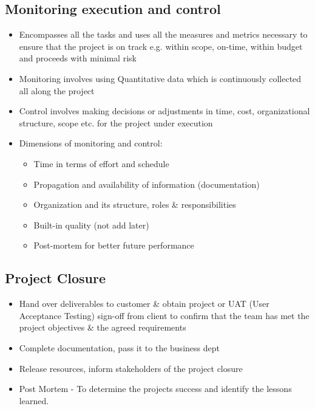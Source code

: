 \documentclass{article}
\begin{document}
\subsection{Monitoring execution and control}
\begin{itemize}
    \item Encompasses all the tasks and uses all the measures and metrics necessary to ensure that the project is on track e.g. within scope, on-time, within budget and proceeds with minimal risk
    
    \item Monitoring involves using Quantitative data which is continuously collected all along the project
    
    \item Control involves making decisions or adjustments in time, cost, organizational structure, scope etc. for the project under execution
    
    \item Dimensions of monitoring and control:
    \begin{itemize}
        \item Time in terms of effort and schedule
        
        \item Propagation and availability of information (documentation)
        
        \item Organization and its structure, roles \& responsibilities
        
        \item Built-in quality (not add later)
        
        \item Post-mortem for better future performance
    \end{itemize}
\end{itemize}

\subsection{Project Closure}
\begin{itemize}
    \item Hand over deliverables to customer \& obtain project or UAT (User Acceptance Testing) sign-off from client to confirm that the team has met the project objectives \& the agreed requirements
    
    \item Complete documentation, pass it to the business dept
    
    \item Release resources, inform stakeholders of the project closure
    
    \item Post Mortem - To determine the projects success and identify the lessons learned.

\end{itemize}
\end{document}

